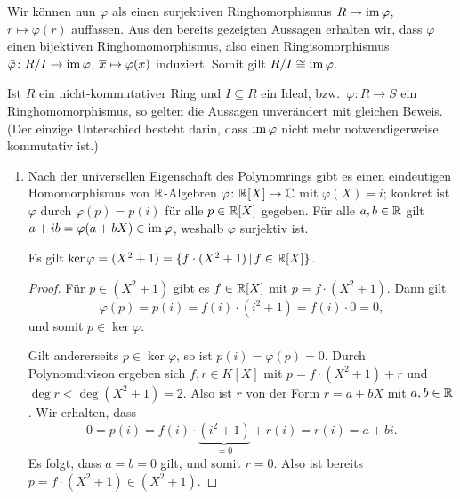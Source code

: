 Wir können nun $\varphi$ als einen surjektiven Ringhomorphismus $R \to \operatorname{im} \varphi$, $r \mapsto \varphi(r)$ auffassen.
Aus den bereits gezeigten Aussagen erhalten wir, dass $\varphi$ einen bijektiven Ringhomomorphismus, also einen Ringisomorphismus $\bar{\varphi} \colon R/I \to \operatorname{im} \varphi$, $\overline{x} \mapsto \varphi(x)$ induziert.
Somit gilt $R/I \cong \operatorname{im} \varphi$.

\begin{remark}
  Ist $R$ ein nicht-kommutativer Ring und $I \subseteq R$ ein Ideal, bzw.\ $\varphi \colon R \to S$ ein Ringhomomorphismus, so gelten die Aussagen unverändert mit gleichen Beweis.
  (Der einzige Unterschied besteht darin, dass $\operatorname{im} \varphi$ nicht mehr notwendigerweise kommutativ ist.)
\end{remark}

\begin{example}
  \begin{enumerate}
    \item
      Nach der universellen Eigenschaft des Polynomrings gibt es einen eindeutigen Homomorphismus von $\mathbb{R}$-Algebren $\varphi \colon \mathbb{R}[X] \to \mathbb{C}$ mit $\varphi(X) = i$;
      konkret ist $\varphi$ durch $\varphi(p) = p(i)$ für alle $p \in \mathbb{R}[X]$ gegeben.
      Für alle $a, b \in \mathbb{R}$ gilt $a + ib = \varphi(a + bX) \in \operatorname{im} \varphi$, weshalb $\varphi$ surjektiv ist.
      
      \begin{claim}
        Es gilt $\ker \varphi = (X^2 + 1) = \{f \cdot (X^2 + 1) \,|\, f \in \mathbb{R}[X]\}$.
      \end{claim}
      \begin{proof}
        Für $p \in (X^2 + 1)$ gibt es $f \in \mathbb{R}[X]$ mit $p = f \cdot (X^2 + 1)$.
        Dann gilt
        \[
            \varphi(p)
          = p(i)
          = f(i) \cdot (i^2 + 1)
          = f(i) \cdot 0
          = 0,
        \]
        und somit $p \in \ker \varphi$.
        
        Gilt andererseits $p \in \ker \varphi$, so ist $p(i) = \varphi(p) = 0$.
        Durch Polynomdivison ergeben sich $f, r \in K[X]$ mit $p = f \cdot (X^2 + 1) + r$ und $\deg r < \deg(X^2 + 1) = 2$.
        Also ist $r$ von der Form $r = a + bX$ mit $a, b \in \mathbb{R}$.
        Wir erhalten, dass
        \[
            0
          = p(i)
          = f(i) \cdot \underbrace{(i^2 + 1)}_{=0} + r(i)
          = r(i)
          = a + bi.
        \]
        Es folgt, dass $a = b = 0$ gilt, und somit $r = 0$.
        Also ist bereits $p = f \cdot (X^2 + 1) \in (X^2 + 1)$.
      \end{proof}
      

\end{enumerate}
\end{example}
